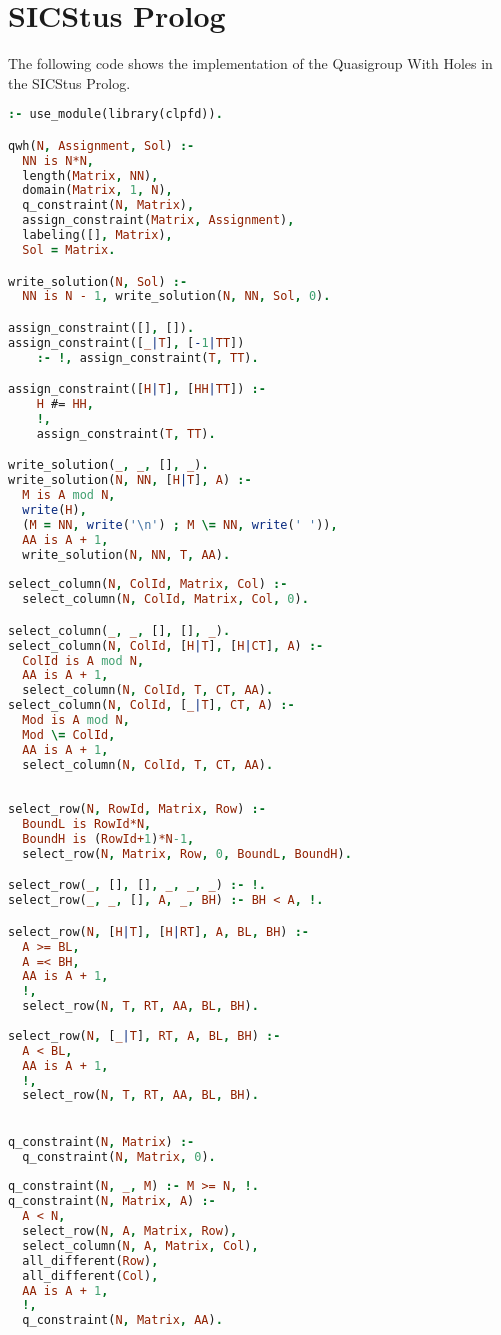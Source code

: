 \section{SICStus Prolog}
\label{implementation:sicstus}

The following code shows the implementation of the Quasigroup With Holes in the SICStus
Prolog.

\begin{lstlisting}[language=Prolog]
:- use_module(library(clpfd)).

qwh(N, Assignment, Sol) :-
  NN is N*N,
  length(Matrix, NN),
  domain(Matrix, 1, N),
  q_constraint(N, Matrix),
  assign_constraint(Matrix, Assignment),
  labeling([], Matrix),
  Sol = Matrix.

write_solution(N, Sol) :-
  NN is N - 1, write_solution(N, NN, Sol, 0).

assign_constraint([], []).
assign_constraint([_|T], [-1|TT]) 
	:- !, assign_constraint(T, TT).

assign_constraint([H|T], [HH|TT]) :- 
	H #= HH,
	!,
	assign_constraint(T, TT).

write_solution(_, _, [], _).
write_solution(N, NN, [H|T], A) :-
  M is A mod N,
  write(H),
  (M = NN, write('\n') ; M \= NN, write(' ')),
  AA is A + 1,
  write_solution(N, NN, T, AA).
  
select_column(N, ColId, Matrix, Col) :- 
  select_column(N, ColId, Matrix, Col, 0).

select_column(_, _, [], [], _).
select_column(N, ColId, [H|T], [H|CT], A) :-
  ColId is A mod N,
  AA is A + 1,
  select_column(N, ColId, T, CT, AA).
select_column(N, ColId, [_|T], CT, A) :-
  Mod is A mod N,
  Mod \= ColId,
  AA is A + 1,
  select_column(N, ColId, T, CT, AA).
  
  
select_row(N, RowId, Matrix, Row) :-  
  BoundL is RowId*N, 
  BoundH is (RowId+1)*N-1, 
  select_row(N, Matrix, Row, 0, BoundL, BoundH).

select_row(_, [], [], _, _, _) :- !.
select_row(_, _, [], A, _, BH) :- BH < A, !.

select_row(N, [H|T], [H|RT], A, BL, BH) :-
  A >= BL,
  A =< BH,
  AA is A + 1,
  !,
  select_row(N, T, RT, AA, BL, BH).
  
select_row(N, [_|T], RT, A, BL, BH) :-
  A < BL,
  AA is A + 1,
  !,
  select_row(N, T, RT, AA, BL, BH).
  

q_constraint(N, Matrix) :-
  q_constraint(N, Matrix, 0).
  
q_constraint(N, _, M) :- M >= N, !.
q_constraint(N, Matrix, A) :- 
  A < N,
  select_row(N, A, Matrix, Row),
  select_column(N, A, Matrix, Col),
  all_different(Row),
  all_different(Col),
  AA is A + 1,
  !,
  q_constraint(N, Matrix, AA).
\end{lstlisting}